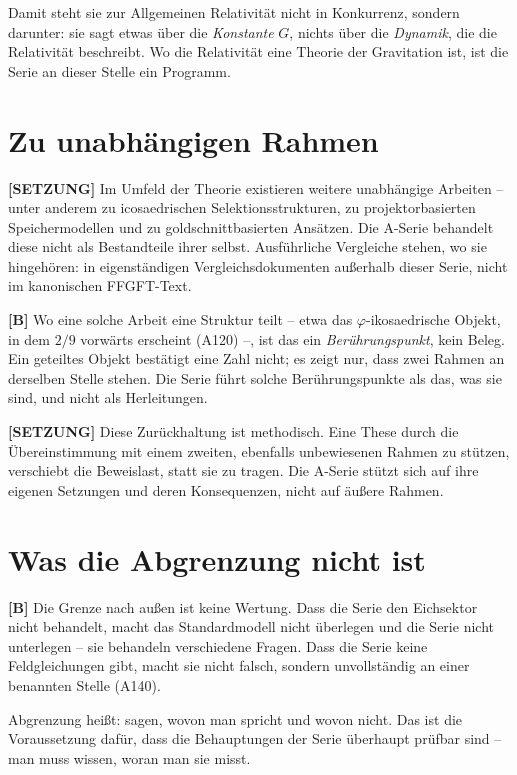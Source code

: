 Damit steht sie zur Allgemeinen Relativität nicht in Konkurrenz, sondern
darunter: sie sagt etwas über die \emph{Konstante} $G$, nichts über die
\emph{Dynamik}, die die Relativität beschreibt. Wo die Relativität eine Theorie
der Gravitation ist, ist die Serie an dieser Stelle ein Programm.

\section{Zu unabhängigen Rahmen}

\textbf{[SETZUNG]} Im Umfeld der Theorie existieren weitere unabhängige Arbeiten
-- unter anderem zu icosaedrischen Selektionsstrukturen, zu projektorbasierten
Speichermodellen und zu goldschnittbasierten Ansätzen. Die A-Serie behandelt
diese nicht als Bestandteile ihrer selbst. Ausführliche Vergleiche stehen, wo
sie hingehören: in eigenständigen Vergleichsdokumenten außerhalb dieser Serie,
nicht im kanonischen FFGFT-Text.

\textbf{[B]} Wo eine solche Arbeit eine Struktur teilt -- etwa das
$\varphi$-ikosaedrische Objekt, in dem $2/9$ vorwärts erscheint (A120) --, ist
das ein \emph{Berührungspunkt}, kein Beleg. Ein geteiltes Objekt bestätigt eine
Zahl nicht; es zeigt nur, dass zwei Rahmen an derselben Stelle stehen. Die Serie
führt solche Berührungspunkte als das, was sie sind, und nicht als
Herleitungen.

\textbf{[SETZUNG]} Diese Zurückhaltung ist methodisch. Eine These durch die
Übereinstimmung mit einem zweiten, ebenfalls unbewiesenen Rahmen zu stützen,
verschiebt die Beweislast, statt sie zu tragen. Die A-Serie stützt sich auf ihre
eigenen Setzungen und deren Konsequenzen, nicht auf äußere Rahmen.

\section{Was die Abgrenzung nicht ist}

\textbf{[B]} Die Grenze nach außen ist keine Wertung. Dass die Serie den
Eichsektor nicht behandelt, macht das Standardmodell nicht überlegen und die
Serie nicht unterlegen -- sie behandeln verschiedene Fragen. Dass die Serie
keine Feldgleichungen gibt, macht sie nicht falsch, sondern unvollständig an
einer benannten Stelle (A140).

Abgrenzung heißt: sagen, wovon man spricht und wovon nicht. Das ist die
Voraussetzung dafür, dass die Behauptungen der Serie überhaupt prüfbar sind --
man muss wissen, woran man sie misst.



